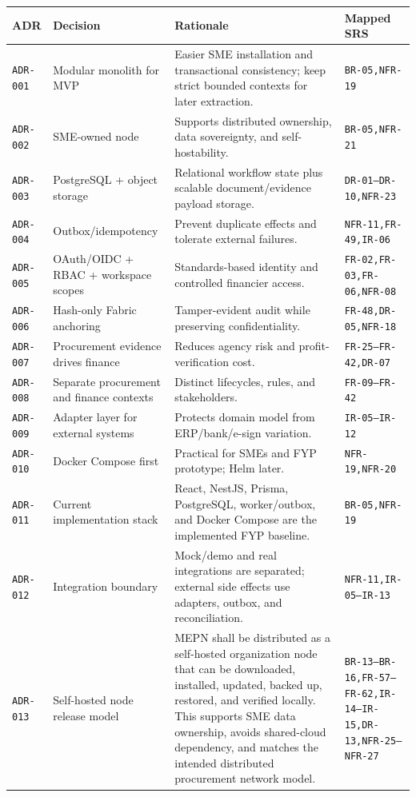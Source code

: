 \documentclass[11pt,a4paper]{article}
\newcommand{\req}[1]{\texttt{#1}}
\newcommand{\adr}[1]{\texttt{ADR-#1}}
\begin{document}
\begin{longtable}{L{23mm}L{34mm}L{48mm}L{42mm}}
\toprule
\textbf{ADR} & \textbf{Decision} & \textbf{Rationale} & \textbf{Mapped SRS} \\
\midrule
\adr{001} & Modular monolith for MVP & Easier SME installation and transactional consistency; keep strict bounded contexts for later extraction. & \req{BR-05,NFR-19} \\
\adr{002} & SME-owned node & Supports distributed ownership, data sovereignty, and self-hostability. & \req{BR-05,NFR-21} \\
\adr{003} & PostgreSQL + object storage & Relational workflow state plus scalable document/evidence payload storage. & \req{DR-01--DR-10,NFR-23} \\
\adr{004} & Outbox/idempotency & Prevent duplicate effects and tolerate external failures. & \req{NFR-11,FR-49,IR-06} \\
\adr{005} & OAuth/OIDC + RBAC + workspace scopes & Standards-based identity and controlled financier access. & \req{FR-02,FR-03,FR-06,NFR-08} \\
\adr{006} & Hash-only Fabric anchoring & Tamper-evident audit while preserving confidentiality. & \req{FR-48,DR-05,NFR-18} \\
\adr{007} & Procurement evidence drives finance & Reduces agency risk and profit-verification cost. & \req{FR-25--FR-42,DR-07} \\
\adr{008} & Separate procurement and finance contexts & Distinct lifecycles, rules, and stakeholders. & \req{FR-09--FR-42} \\
\adr{009} & Adapter layer for external systems & Protects domain model from ERP/bank/e-sign variation. & \req{IR-05--IR-12} \\
\adr{010} & Docker Compose first & Practical for SMEs and FYP prototype; Helm later. & \req{NFR-19,NFR-20} \\
\adr{011} & Current implementation stack & React, NestJS, Prisma, PostgreSQL, worker/outbox, and Docker Compose are the implemented FYP baseline. & \req{BR-05,NFR-19} \\
\adr{012} & Integration boundary & Mock/demo and real integrations are separated; external side effects use adapters, outbox, and reconciliation. & \req{NFR-11,IR-05--IR-13} \\
\adr{013} & Self-hosted node release model & MEPN shall be distributed as a self-hosted organization node that can be downloaded, installed, updated, backed up, restored, and verified locally. This supports SME data ownership, avoids shared-cloud dependency, and matches the intended distributed procurement network model. & \req{BR-13--BR-16,FR-57--FR-62,IR-14--IR-15,DR-13,NFR-25--NFR-27} \\

\end{longtable}
\end{document}
